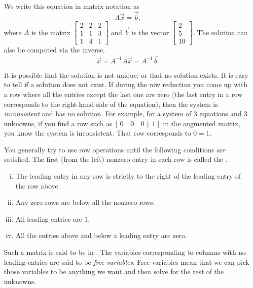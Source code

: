We write this equation in matrix notation as
\begin{equation*}
A \vec{x} = \vec{b} ,
\end{equation*}
where $A$ is the matrix
$\left[ \begin{smallmatrix}
2 & 2 & 2 \\
1 & 1 & 3 \\
1 & 4 & 1 
\end{smallmatrix} \right]$ and $\vec{b}$ is the vector
$\left[ \begin{smallmatrix}
2 \\
5 \\
10
\end{smallmatrix} \right]$.  The solution can also be computed via the
inverse,
\begin{equation*}
\vec{x} = A^{-1} A \vec{x} = A^{-1} \vec{b} .
\end{equation*}

\medskip

It is
possible that the solution is not unique, or that no solution exists.
It is easy to tell if a solution does not exist.  If during the row
reduction you come up with a row where all the entries except the last one
are zero (the last entry in a row corresponds to the right-hand side of the
equation), then the system is \emph{inconsistent} and
has no solution.  For
example, for a system of 3 equations and 3 unknowns, if you find a row
such as $[\,0 \quad 0 \quad 0 ~\,|\,~ 1\,]$ in the augmented matrix,
you know the system is inconsistent.  That row corresponds to $0=1$.

\medskip

You generally try to use row operations until the following conditions
are satisfied.  The first (from the left) nonzero entry in each row is called the
\emph{}.
\begin{enumerate}[(i)]
\item The leading entry in any row is strictly to the right of
the leading entry of the row above.
\item Any zero rows are below all the nonzero rows.
\item All leading entries are 1.
\item All the entries above and below a leading entry are zero.
\end{enumerate}
Such a matrix is said to be in
\emph{}.  The variables
corresponding to columns with no leading entries are said to be
\emph{free variables}.
Free variables mean that we can pick those variables
to be anything we want and then solve for the rest of the unknowns.

